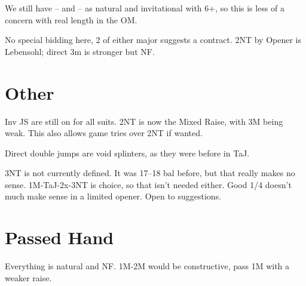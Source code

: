 \documentclass[tom-ari]{subfile}
\begin{document}
	We still have -- and -- as natural and invitational with 6+, so this is less of a concern with real length in the OM.  
	
	No special bidding here, 2 of either major suggests a contract.  2NT by Opener is Lebensohl; direct 3m is stronger but NF.
	
	\section{Other}
	
	Inv JS are still on for all suits.  2NT is now the Mixed Raise, with 3M being weak.  This also allows game tries over 2NT if wanted.
	
	Direct double jumps are void splinters, as they were before in TaJ.  
	
	3NT is not currently defined.  It was 17--18 bal before, but that really makes no sense. 1M-TaJ-2x-3NT is choice, so that isn't needed either.  Good 1/4 doesn't much make sense in a limited opener.  Open to suggestions.
	
	\section{Passed Hand}
	
	Everything is natural and NF. 1M-2M would be constructive, pass 1M with a weaker raise.
	  
\end{document}
